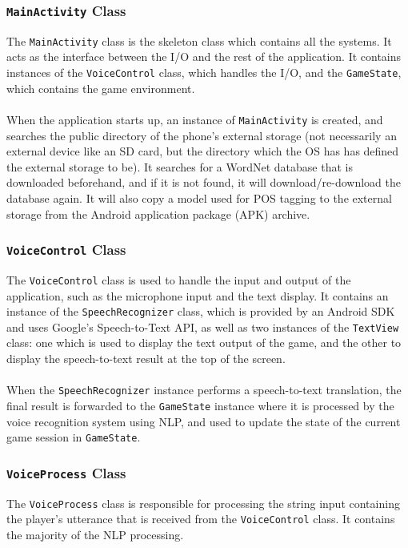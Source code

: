 \documentclass[11pt]{article}
\begin{document}
\subsubsection{\texttt{MainActivity} Class}

The \texttt{MainActivity} class is the skeleton class which contains all the systems. It acts as the interface between the I/O and the rest of the application. It contains instances of the \texttt{VoiceControl} class, which handles the I/O, and the \texttt{GameState}, which contains the game environment.
\\
\\
When the application starts up, an instance of \texttt{MainActivity} is created, and searches the public directory of the phone's external storage (not necessarily an external device like an SD card, but the directory which the OS has has defined the external storage to be). It searches for a WordNet database that is downloaded beforehand, and if it is not found, it will download/re-download the database again. It will also copy a model used for POS tagging to the external storage from the Android application package (APK) archive.

\subsubsection{\texttt{VoiceControl} Class}

The \texttt{VoiceControl} class is used to handle the input and output of the application, such as the microphone input and the text display. It contains an instance of the \texttt{SpeechRecognizer} class, which is provided by an Android SDK and uses Google's Speech-to-Text API, as well as two instances of the \texttt{TextView} class: one which is used to display the text output of the game, and the other to display the speech-to-text result at the top of the screen.
\\
\\
When the \texttt{SpeechRecognizer} instance performs a speech-to-text translation, the final result is forwarded to the \texttt{GameState} instance where it is processed by the voice recognition system using NLP, and used to update the state of the current game session in \texttt{GameState}.

\subsubsection{\texttt{VoiceProcess} Class}

The \texttt{VoiceProcess} class is responsible for processing the string input containing the player's utterance that is received from the \texttt{VoiceControl} class. It contains the majority of the NLP processing.
\end{document}

